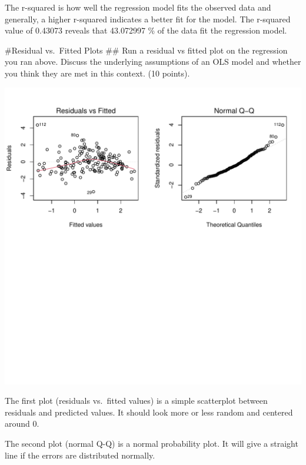 \documentclass[
]{article}
\begin{document}
The r-squared is how well the regression model fits the observed data
and generally, a higher r-squared indicates a better fit for the model.
The r-squared value of 0.43073 reveals that 43.072997 \% of the data fit
the regression model.

\#Residual vs.~Fitted Plots \#\# Run a residual vs fitted plot on the
regression you ran above. Discuss the underlying assumptions of an OLS
model and whether you think they are met in this context. (10 points).

\includegraphics{LinearLab_files/figure-latex/res.vs.fit-1.pdf}

The first plot (residuals vs.~fitted values) is a simple scatterplot
between residuals and predicted values. It should look more or less
random and centered around 0.

The second plot (normal Q-Q) is a normal probability plot. It will give
a straight line if the errors are distributed normally.
\end{document}
